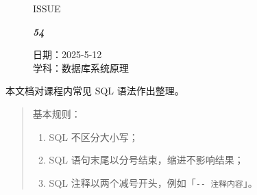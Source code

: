 \documentclass[UTF8]{ctexart}
\newcommand\Black[1]{\textcolor[gray]{0.3}{#1}}
\newcommand\Brown[1]{\textcolor[HTML]{998A4E}{#1}}
\newcommand\IssueNumber{54}
\newcommand\Date{2025-5-12}
\newcommand\Subject{数据库系统原理}
\begin{document}
\begin{figure}[H]
\hspace{1cm}
\begin{minipage}[t]{0.3\textwidth}
\centering
    \Brown{\Genshin ISSUE}

    \vspace{-0.6cm}
    \Huge \Issue\slshape\bfseries\Black{\IssueNumber}
\end{minipage}
\hfill
\begin{minipage}[t]{0.3\textwidth}
\centering
\vspace{-0.1cm}
    \Brown{日期：\Date} \\
    \Brown{学科：\Subject} \\
\end{minipage}
\hspace{0.8cm}
\end{figure}

{\color{darkcyan} 本文档对课程内常见 SQL 语法作出整理。}

\begin{quote}
    \small 基本规则：
\begin{enumerate}[itemsep=0pt,parsep=0pt]
     \item SQL 不区分大小写；
     \item SQL 语句末尾以分号结束，缩进不影响结果；
     \item SQL 注释以两个减号开头，例如「\verb!-- 注释内容!」。
\end{enumerate}
\end{quote}


\tableofcontents
\end{document}
